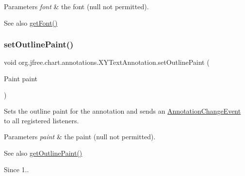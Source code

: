 \begin{DoxyParams}{Parameters}
{\em font} & the font ({\ttfamily null} not permitted).\\
\hline
\end{DoxyParams}
\begin{DoxySeeAlso}{See also}
\mbox{\hyperlink{classorg_1_1jfree_1_1chart_1_1annotations_1_1_x_y_text_annotation_a5db5176b7e4eca80d7d54179953d5250}{get\+Font()}} 
\end{DoxySeeAlso}
\mbox{\label{classorg_1_1jfree_1_1chart_1_1annotations_1_1_x_y_text_annotation_a91879f03695e989564897cf72d219d22}} 
\subsubsection{\texorpdfstring{set\+Outline\+Paint()}{setOutlinePaint()}}
{\footnotesize\ttfamily void org.\+jfree.\+chart.\+annotations.\+X\+Y\+Text\+Annotation.\+set\+Outline\+Paint (\begin{DoxyParamCaption}\item[{Paint}]{paint }\end{DoxyParamCaption})}

Sets the outline paint for the annotation and sends an \mbox{\hyperlink{}{Annotation\+Change\+Event}} to all registered listeners.


\begin{DoxyParams}{Parameters}
{\em paint} & the paint ({\ttfamily null} not permitted).\\
\hline
\end{DoxyParams}
\begin{DoxySeeAlso}{See also}
\mbox{\hyperlink{classorg_1_1jfree_1_1chart_1_1annotations_1_1_x_y_text_annotation_a1ab87e5e927bca22a4439a37b353d4f1}{get\+Outline\+Paint()}}
\end{DoxySeeAlso}
\begin{DoxySince}{Since}
1.. 
\end{DoxySince}
\mbox{\label{classorg_1_1jfree_1_1chart_1_1annotations_1_1_x_y_text_annotation_af3e01447131d46bad78ca98e9bcbf3b1}} 
